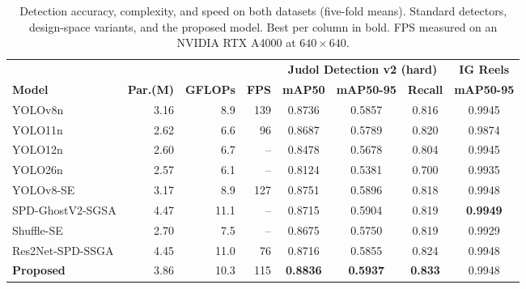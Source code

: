 \begin{table}[t]
\centering
\caption{Detection accuracy, complexity, and speed on both datasets (five-fold means). Standard detectors, design-space variants, and the proposed model. Best per column in bold. FPS measured on an NVIDIA RTX A4000 at $640\times640$.}
\label{tab:comparison}
\begin{tabular}{@{}lrrrcccc@{}}
\toprule
& & & & \multicolumn{3}{c}{\textbf{Judol Detection v2 (hard)}} & \textbf{IG Reels} \\
\cmidrule(lr){5-7}\cmidrule(lr){8-8}
\textbf{Model} & \textbf{Par.(M)} & \textbf{GFLOPs} & \textbf{FPS} & \textbf{mAP50} & \textbf{mAP50-95} & \textbf{Recall} & \textbf{mAP50-95} \\
\midrule
YOLOv8n & 3.16 & 8.9 & 139 & 0.8736 & 0.5857 & 0.816 & 0.9945 \\
YOLO11n & 2.62 & 6.6 & 96 & 0.8687 & 0.5789 & 0.820 & 0.9874 \\
YOLO12n & 2.60 & 6.7 & -- & 0.8478 & 0.5678 & 0.804 & 0.9945 \\
YOLO26n & 2.57 & 6.1 & -- & 0.8124 & 0.5381 & 0.700 & 0.9935 \\
YOLOv8-SE & 3.17 & 8.9 & 127 & 0.8751 & 0.5896 & 0.818 & 0.9948 \\
SPD-GhostV2-SGSA & 4.47 & 11.1 & -- & 0.8715 & 0.5904 & 0.819 & \textbf{0.9949} \\
Shuffle-SE & 2.70 & 7.5 & -- & 0.8675 & 0.5750 & 0.819 & 0.9929 \\
Res2Net-SPD-SSGA & 4.45 & 11.0 & 76 & 0.8716 & 0.5855 & 0.824 & 0.9948 \\
\textbf{Proposed} & 3.86 & 10.3 & 115 & \textbf{0.8836} & \textbf{0.5937} & \textbf{0.833} & 0.9948 \\
\bottomrule
\end{tabular}
\end{table}
